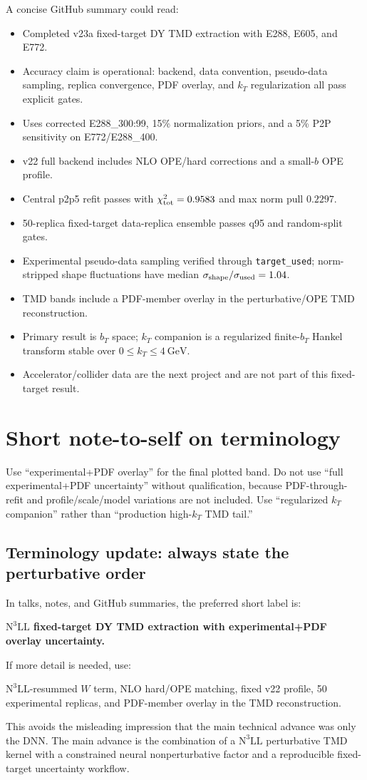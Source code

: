 \documentclass[11pt]{article}
\newcommand{\bt}{b_T}
\newcommand{\kt}{k_T}
\newcommand{\chisq}{\chi^2}
\newcommand{\GeV}{\mathrm{GeV}}
\newcommand{\NthreeLL}{\mathrm{N^{3}LL}}
\newcommand{\code}[1]{\texttt{#1}}
\begin{document}
A concise GitHub summary could read:
\begin{itemize}
  \item Completed v23a fixed-target DY TMD extraction with E288, E605, and E772.
  \item Accuracy claim is operational: backend, data convention, pseudo-data sampling, replica convergence, PDF overlay, and $\kt$ regularization all pass explicit gates.
  \item Uses corrected E288\_300:99, 15\% normalization priors, and a 5\% P2P sensitivity on E772/E288\_400.
  \item v22 full backend includes NLO OPE/hard corrections and a small-$b$ OPE profile.
  \item Central p2p5 refit passes with $\chisq_{\rm tot}=0.9583$ and max norm pull $0.2297$.
  \item 50-replica fixed-target data-replica ensemble passes q95 and random-split gates.
  \item Experimental pseudo-data sampling verified through \code{target\_used}; norm-stripped shape fluctuations have median $\sigma_{\rm shape}/\sigma_{\rm used}=1.04$.
  \item TMD bands include a PDF-member overlay in the perturbative/OPE TMD reconstruction.
  \item Primary result is $\bt$ space; $\kt$ companion is a regularized finite-$\bt$ Hankel transform stable over $0\le\kt\le4~\GeV$.
  \item Accelerator/collider data are the next project and are not part of this fixed-target result.
\end{itemize}

\section{Short note-to-self on terminology}

Use ``experimental+PDF overlay'' for the final plotted band.  Do not use ``full experimental+PDF uncertainty'' without qualification, because PDF-through-refit and profile/scale/model variations are not included.  Use ``regularized $\kt$ companion'' rather than ``production high-$\kt$ TMD tail.''


\subsection*{Terminology update: always state the perturbative order}

In talks, notes, and GitHub summaries, the preferred short label is:
\begin{center}
\textbf{$\NthreeLL$ fixed-target DY TMD extraction with experimental+PDF overlay uncertainty.}
\end{center}
If more detail is needed, use:
\begin{center}
$\NthreeLL$-resummed $W$ term, NLO hard/OPE matching, fixed v22 profile, 50 experimental replicas, and PDF-member overlay in the TMD reconstruction.
\end{center}
This avoids the misleading impression that the main technical advance was only the DNN.  The main advance is the combination of a $\NthreeLL$ perturbative TMD kernel with a constrained neural nonperturbative factor and a reproducible fixed-target uncertainty workflow.
\end{document}
